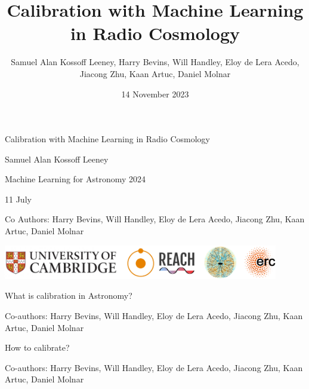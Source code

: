 \documentclass{beamer}
\begin{document}
\title{Calibration with Machine Learning in Radio Cosmology}
\date{14 November 2023}
\author{Samuel Alan Kossoff Leeney, Harry Bevins, Will Handley, Eloy de Lera Acedo, Jiacong Zhu, Kaan Artuc, Daniel Molnar}
\begin{frame}
  \begin{center}
    {\LARGE Calibration with Machine Learning in Radio Cosmology\par}
    \vspace{0.5cm}

    {\large Samuel Alan Kossoff Leeney\par}
    \vspace{0.5cm}

    {\normalsize Machine Learning for Astronomy 2024\par}

    {\normalsize 11 July\par}
    \vspace{1cm}

    {\footnotesize Co Authors: Harry Bevins, Will Handley, Eloy de Lera Acedo, Jiacong Zhu, Kaan Artuc, Daniel Molnar\par}
    \vfill

    \includegraphics[width=0.9\textwidth]{affiliations.png}
  \end{center}
\end{frame}

\begin{frame}{\small{What is calibration in Astronomy?}}
\begin{figure}[h]
  \centering
  
\end{figure}
\vfill
    \tiny{Co-authors: Harry Bevins, Will Handley, Eloy de Lera Acedo, Jiacong Zhu, Kaan Artuc, Daniel Molnar}
  \end{frame}


\begin{frame}{\small{How to calibrate?}}
\begin{figure}[h]
  \centering
  
\end{figure}

\vfill
    \tiny{Co-authors: Harry Bevins, Will Handley, Eloy de Lera Acedo, Jiacong Zhu, Kaan Artuc, Daniel Molnar}
  \end{frame}
\end{document}
